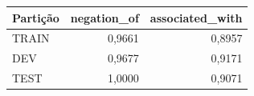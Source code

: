 \begin{tabular}{lrr}
\toprule
Partição & negation\_of & associated\_with \\
\midrule
TRAIN & 0,9661 & 0,8957 \\
DEV & 0,9677 & 0,9171 \\
TEST & 1,0000 & 0,9071 \\
\bottomrule
\end{tabular}
